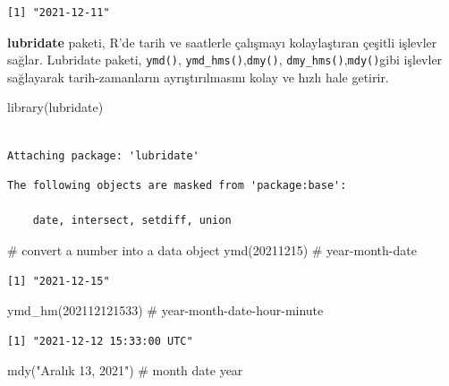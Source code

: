 \documentclass[
  letterpaper,
  DIV=11,
  numbers=noendperiod]{scrreprt}
\newenvironment{Shaded}{\begin{snugshade}}{\end{snugshade}}
\newcommand{\CommentTok}[1]{\textcolor[rgb]{0.37,0.37,0.37}{#1}}
\newcommand{\DecValTok}[1]{\textcolor[rgb]{0.68,0.00,0.00}{#1}}
\newcommand{\FunctionTok}[1]{\textcolor[rgb]{0.28,0.35,0.67}{#1}}
\newcommand{\NormalTok}[1]{\textcolor[rgb]{0.00,0.23,0.31}{#1}}
\newcommand{\StringTok}[1]{\textcolor[rgb]{0.13,0.47,0.30}{#1}}
\begin{document}
\begin{verbatim}
[1] "2021-12-11"
\end{verbatim}

\textbf{lubridate} paketi, R'de tarih ve saatlerle çalışmayı
kolaylaştıran çeşitli işlevler sağlar. Lubridate paketi, \texttt{ymd()},
\texttt{ymd\_hms()},\texttt{dmy()},
\texttt{dmy\_hms()},\texttt{mdy()}gibi işlevler sağlayarak
tarih-zamanların ayrıştırılmasını kolay ve hızlı hale getirir.

\begin{Shaded}
\begin{Highlighting}[]
\FunctionTok{library}\NormalTok{(lubridate)}
\end{Highlighting}
\end{Shaded}

\begin{verbatim}

Attaching package: 'lubridate'
\end{verbatim}

\begin{verbatim}
The following objects are masked from 'package:base':

    date, intersect, setdiff, union
\end{verbatim}

\begin{Shaded}
\begin{Highlighting}[]
\CommentTok{\# convert a number into a data object}
\FunctionTok{ymd}\NormalTok{(}\DecValTok{20211215}\NormalTok{) }\CommentTok{\# year{-}month{-}date}
\end{Highlighting}
\end{Shaded}

\begin{verbatim}
[1] "2021-12-15"
\end{verbatim}

\begin{Shaded}
\begin{Highlighting}[]
\FunctionTok{ymd\_hm}\NormalTok{(}\DecValTok{202112121533}\NormalTok{) }\CommentTok{\# year{-}month{-}date{-}hour{-}minute}
\end{Highlighting}
\end{Shaded}

\begin{verbatim}
[1] "2021-12-12 15:33:00 UTC"
\end{verbatim}

\begin{Shaded}
\begin{Highlighting}[]
\FunctionTok{mdy}\NormalTok{(}\StringTok{"Aralık 13, 2021"}\NormalTok{) }\CommentTok{\# month date year}
\end{Highlighting}
\end{Shaded}
\end{document}
